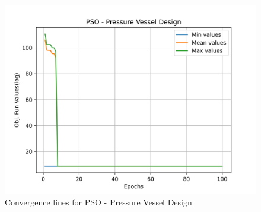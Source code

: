 \begin{figure}[H]
        \centering
        \caption{Convergence lines for PSO - Pressure Vessel Design}
        \label{fig:pressure_vessel_problem_solve_pso}
        \includegraphics[scale=0.5]{images/pressure_vessel_problem_solve_pso.png}
        \end{figure}
        